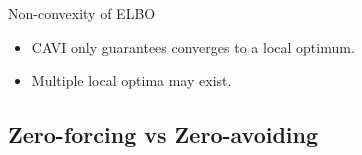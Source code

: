 \begin{frame}{Non-convexity of ELBO}
  \vspace{-4pt}
  \begin{figure}
  \end{figure}
  \vspace{-8pt}
  \begin{itemize}
    \item CAVI only guarantees converges to a local optimum.
    \item Multiple local optima may exist.
  \end{itemize}
\end{frame}

\subsection{Zero-forcing vs Zero-avoiding}


